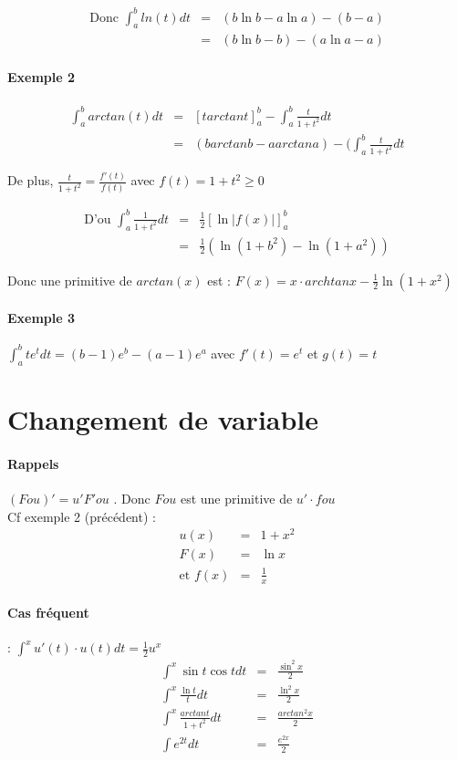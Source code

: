 		\[\begin{array}{rcl}
				\text{Donc } \int_a^b ln(t)dt &=& (b \ln b - a \ln a) - (b-a) \\
										  &=& (b \ln b - b) - (a \ln a - a) \end{array}\]

	\paragraph{Exemple 2} \[\begin{array}{rcl}
		\int_a^b arctan(t)dt &=& [t arctan t]^b_a - \int_a^b \frac{t}{1+t^2} dt \\
																								   &=& (b arctan b -a arctan a) - (\int_a^b \frac{t}{1+t^2} dt \end{array}\]

		De plus, $\frac{t}{1+t^2} = \frac{f'(t)}{f(t)}$ avec $f(t) = 1+t^2 \geq 0$

		\[\begin{array}{rcl}
		\text{D'ou } \int_a^b \frac{1}{1+t^2} dt &=& \frac{1}{2}[\ln |f(x)|]^b_a \\
		  &=& \frac{1}{2} (\ln(1+b^2) - \ln(1+a^2)) \end{array}\]

		Donc une primitive de $arctan(x)$ est : $F(x) = x \cdot archtan x - \frac{1}{2}\ln(1+x^2)$

		\paragraph{Exemple 3} $\int_a^b te^t dt = (b-1)e^b - (a-1)e^a$ avec $f'(t) = e^t$ et $g(t) = t$


		\section{Changement de variable}

		\paragraph{Rappels} $(Fou)' = u'F'ou$ . Donc $Fou$ est une primitive de $u' \cdot fou$ ~\\
		Cf exemple 2 (précédent) : \[\begin{array}{rcl}
				u(x) &=& 1+x^2 \\
				F(x) &=& \ln x \\
		\text{et } f(x) &=& \frac{1}{x} \end{array}\]

				\paragraph{Cas fréquent} : $ \int^x u'(t)\cdot u(t) dt = \frac{1}{2}u^{x}$
				\[\begin{array}{rcl}
						\int^x \sin t \cos t dt &=& \frac{\sin^2 x}{2} \\
						\int^x \frac{\ln t}{t} dt &=& \frac{\ln^2 x}{2} \\
						\int^x \frac{arctan t}{1+t^2} dt &=& \frac{arctan^2 x}{2}\\
						\int e^{2t} dt &=& \frac{e^{2x}}{2}\end{array}\]
